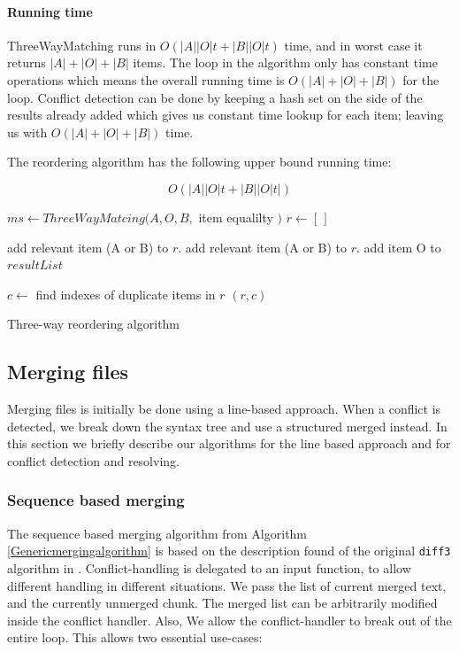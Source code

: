 \documentclass[11pt]{article}
\begin{document}
\paragraph{Running time} ThreeWayMatching runs in $O(|A||O| t + |B||O| t)$ time, and in worst case it returns $|A|+|O|+|B|$ items. The loop in the algorithm only has constant time operations which means the overall running time is $O(|A|+|O|+|B|)$ for the loop. Conflict detection can be done by keeping a hash set on the side of the results already added which gives us constant time lookup for each item; leaving us with $O(|A|+|O|+|B|)$ time.

The reordering algorithm has the following upper bound running time:

\begin{equation}
O(|A||O| t + |B||O| t| ) \nonumber
\end{equation}

\begin{algorithm}
\begin{algorithmic}
   \State $ms \gets ThreeWayMatcing(A, O, B, $ item equalilty $)$
   \State $r \gets [\,]$
   
         \State add relevant item (A or B) to $r$.
      \EndIf
         \State add relevant item (A or B) to $r$.
      \EndIf
         \State add item O to $resultList$
      \EndIf
      
	\EndFor
	\State $c \gets$ find indexes of duplicate items in $r$
	\State \Return $(r, c)$
\EndFunction
\end{algorithmic}
\caption{Three-way reordering algorithm}
  \label{ThreeWayReorderingAlgorithm}
\end{algorithm}

\subsection{Merging files}

\label{MergingFiles}

Merging files is initially be done using a line-based approach. When a conflict is detected, we break down the syntax tree and use a structured merged instead. In this section we briefly describe our algorithms for the line based approach and for conflict detection and resolving.

\subsubsection{Sequence based merging}
The sequence based merging algorithm from Algorithm \ref{Genericmergingalgorithm} is based on the description found of the original \texttt{diff3} algorithm in \citet{Khanna}. Conflict-handling is delegated to an input function, to allow different handling in different situations. We pass the list of current merged text, and the currently unmerged chunk. The merged list can be arbitrarily modified inside the conflict handler. Also, We allow the conflict-handler to break out of the entire loop. This allows two essential use-cases:
\end{document}
